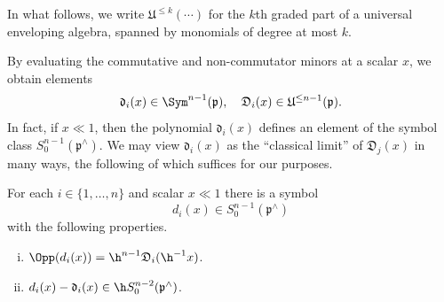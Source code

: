 In what follows, we write $\mathfrak{U}^{\leq k}(\dotsb)$ for the $k$th graded part of a universal enveloping algebra, spanned by monomials of degree at most $k$.

By evaluating the commutative and non-commutator minors at a scalar $x$, we obtain elements
\begin{equation*}
  \mathfrak{d}_i(x) \in \Sym^{n-1}(\mathfrak{p}), \quad \mathfrak{D}_i(x) \in \mathfrak{U}^{\leq n-1}(\mathfrak{p}).
\end{equation*}
In fact, if $x \ll 1$, then the polynomial $\mathfrak{d}_i(x)$ defines an element of the symbol class $S^{n-1}_0(\mathfrak{p}^\wedge)$.  We may view $\mathfrak{d}_i(x)$ as the ``classical limit'' of $\mathfrak{D}_j(x)$ in many ways, the following of which suffices for our purposes.
\begin{lemma}\label{lem:non-comm-cofact}
  For each $i \in \{1, \dotsc, n\}$ and scalar $x \ll 1$ there is a symbol
  \[
    d_i(x) \in S_0^{n-1}(\mathfrak{p}^\wedge)
  \]
  with the following properties.
  \begin{enumerate}[(i)]
  \item $\Opp(d_i(x)) = \h^{n-1} \mathfrak{D}_i(\h^{-1} x)$.
  \item $d_i(x) - \mathfrak{d}_i(x) \in \h S_0^{n-2}(\mathfrak{p}^\wedge)$.
  \end{enumerate}
\end{lemma}
